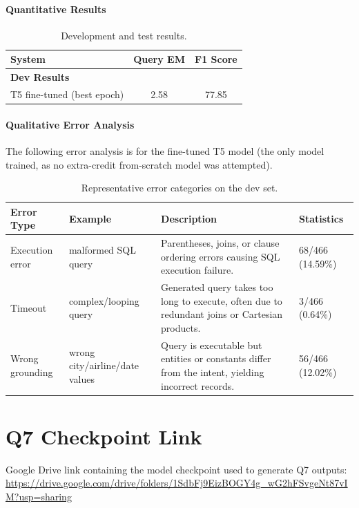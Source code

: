 \documentclass{article}
\begin{document}
\paragraph{Quantitative Results}
\begin{table}[h!]
\centering
\begin{tabular}{lcc}
  \toprule
  System & Query EM & F1 Score \\
  \midrule
  \multicolumn{3}{l}{\textbf{Dev Results}} \\
  \midrule
  T5 fine-tuned (best epoch) & 2.58 & 77.85 \\
  \bottomrule
\end{tabular}
\caption{Development and test results.}
\label{tab:results}
\end{table}

\paragraph{Qualitative Error Analysis}
The following error analysis is for the fine-tuned T5 model (the only model trained, as no extra-credit from-scratch model was attempted).
\begin{table}[h!]
  \centering
  \begin{tabular}{p{2cm}p{3cm}p{5cm}p{3cm}}
    \toprule
    \textbf{Error Type} & \textbf{Example} & \textbf{Description} & \textbf{Statistics} \\
    \midrule
    Execution error & malformed SQL query & Parentheses, joins, or clause ordering errors causing SQL execution failure. & 68/466 (14.59\%) \\
    \midrule
    Timeout & complex/looping query & Generated query takes too long to execute, often due to redundant joins or Cartesian products. & 3/466 (0.64\%) \\
    \midrule
    Wrong grounding & wrong city/airline/date values & Query is executable but entities or constants differ from the intent, yielding incorrect records. & 56/466 (12.02\%) \\
    \bottomrule
  \end{tabular}
  \caption{Representative error categories on the dev set.}
  \label{tab:qualitative}
\end{table}

\section*{Q7 Checkpoint Link}
Google Drive link containing the model checkpoint used to generate Q7 outputs:
\href{https://drive.google.com/drive/folders/1SdbFj9EizBOGY4g_wG2hFSvgeNt87vIM?usp=sharing}{\url{https://drive.google.com/drive/folders/1SdbFj9EizBOGY4g_wG2hFSvgeNt87vIM?usp=sharing}}
\end{document}
